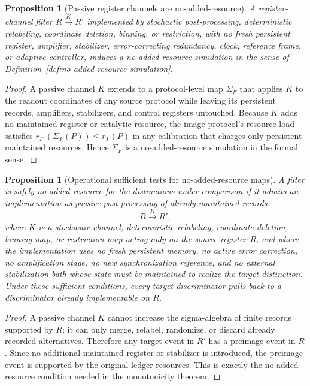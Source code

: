 \documentclass[11pt]{article}
\newtheorem{proposition}[theorem]{Proposition}
\begin{document}
\begin{proposition}[Passive register channels are no-added-resource]\label{prop:register-channels-no-added-resource-formal}
A register-channel filter $R\xrightarrow{K}R'$ implemented by stochastic
post-processing, deterministic relabeling, coordinate deletion, binning,
or restriction, with no fresh persistent register, amplifier,
stabilizer, error-correcting redundancy, clock, reference frame, or
adaptive controller, induces a no-added-resource simulation in the
sense of Definition~\ref{def:no-added-resource-simulation}.
\end{proposition}
\begin{proof}
A passive channel $K$ extends to a protocol-level map $\Sigma_F$ that
applies $K$ to the readout coordinates of any source protocol while
leaving its persistent records, amplifiers, stabilizers, and control
registers untouched.  Because $K$ adds no maintained register or
catalytic resource, the image protocol's resource load satisfies
$r_{\Gamma'}(\Sigma_F(P)) \le r_\Gamma(P)$ in any calibration that
charges only persistent maintained resources.  Hence $\Sigma_F$ is a
no-added-resource simulation in the formal sense.
\end{proof}

\begin{proposition}[Operational sufficient tests for no-added-resource maps]\label{prop:no-added-resource-sufficient-tests}
A filter is safely no-added-resource for the distinctions under comparison if it admits an implementation as passive post-processing of already maintained records:
\[
  R \xrightarrow{K} R',
\]
where $K$ is a stochastic channel, deterministic relabeling, coordinate deletion, binning map, or restriction map acting only on the source register $R$, and where the implementation uses no fresh persistent memory, no active error correction, no amplification stage, no new synchronization reference, and no external stabilization bath whose state must be maintained to realize the target distinction.  Under these sufficient conditions, every target discriminator pulls back to a discriminator already implementable on $R$.
\end{proposition}
\begin{proof}
A passive channel $K$ cannot increase the sigma-algebra of finite records supported by $R$; it can only merge, relabel, randomize, or discard already recorded alternatives.  Therefore any target event in $R'$ has a preimage event in $R$.  Since no additional maintained register or stabilizer is introduced, the preimage event is supported by the original ledger resources.  This is exactly the no-added-resource condition needed in the monotonicity theorem.
\end{proof}
\end{document}
